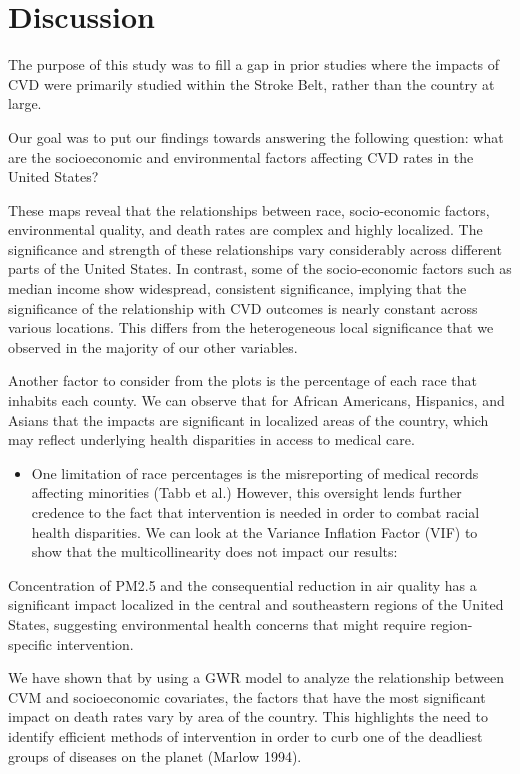\documentclass[
]{article}
\providecommand{\tightlist}{%
  \setlength{\itemsep}{0pt}\setlength{\parskip}{0pt}}\usepackage{longtable,booktabs,array}
\begin{document}
\section{Discussion}\label{discussion}

The purpose of this study was to fill a gap in prior studies where the
impacts of CVD were primarily studied within the Stroke Belt, rather
than the country at large.

Our goal was to put our findings towards answering the following
question: what are the socioeconomic and environmental factors affecting
CVD rates in the United States?

These maps reveal that the relationships between race, socio-economic
factors, environmental quality, and death rates are complex and highly
localized. The significance and strength of these relationships vary
considerably across different parts of the United States. In contrast,
some of the socio-economic factors such as median income show
widespread, consistent significance, implying that the significance of
the relationship with CVD outcomes is nearly constant across various
locations. This differs from the heterogeneous local significance that
we observed in the majority of our other variables.

Another factor to consider from the plots is the percentage of each race
that inhabits each county. We can observe that for African Americans,
Hispanics, and Asians that the impacts are significant in localized
areas of the country, which may reflect underlying health disparities in
access to medical care.

\begin{itemize}
\tightlist
\item
  One limitation of race percentages is the misreporting of medical
  records affecting minorities (Tabb et al.) However, this oversight
  lends further credence to the fact that intervention is needed in
  order to combat racial health disparities. We can look at the Variance
  Inflation Factor (VIF) to show that the multicollinearity does not
  impact our results:
\end{itemize}

Concentration of PM2.5 and the consequential reduction in air quality
has a significant impact localized in the central and southeastern
regions of the United States, suggesting environmental health concerns
that might require region-specific intervention.~

We have shown that by using a GWR model to analyze the relationship
between CVM and socioeconomic covariates, the factors that have the most
significant impact on death rates vary by area of the country. This
highlights the need to identify efficient methods of intervention in
order to curb one of the deadliest groups of diseases on the planet
(Marlow 1994).
\end{document}
